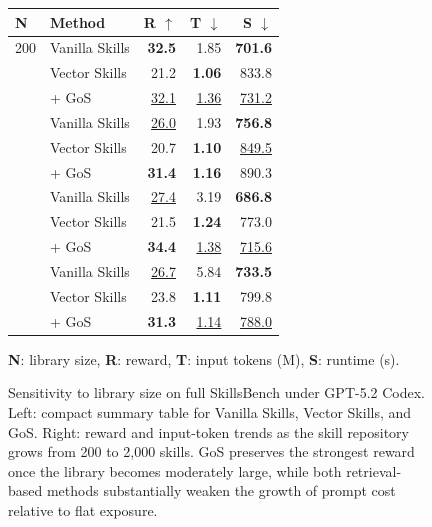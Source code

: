 \begin{figure}[t]
\caption{Sensitivity to library size on full SkillsBench under GPT-5.2 Codex. Left: compact summary table for Vanilla Skills, Vector Skills, and GoS. Right: reward and input-token trends as the skill repository grows from 200 to 2,000 skills. GoS preserves the strongest reward once the library becomes moderately large, while both retrieval-based methods substantially weaken the growth of prompt cost relative to flat exposure.}
\label{fig:scaleup-skillsbench}
\centering
\begin{minipage}[c]{0.46\textwidth}
\centering
\footnotesize
\renewcommand{\arraystretch}{1.0} %
\setlength{\tabcolsep}{5pt}
\begin{tabular}{@{}llrrr@{}}
\toprule
N & Method & R $\uparrow$ & T $\downarrow$ & S $\downarrow$ \\
\midrule
200  & Vanilla Skills    & \textbf{32.5} & 1.85 & \textbf{701.6} \\
     & Vector Skills & 21.2 & \textbf{1.06} & 833.8 \\
     & + GoS         & \underline{32.1} & \underline{1.36} & \underline{731.2} \\
\addlinespace[2pt]
500  & Vanilla Skills    & \underline{26.0} & 1.93 & \textbf{756.8} \\
     & Vector Skills & 20.7 & \textbf{1.10} & \underline{849.5} \\
     & + GoS         & \textbf{31.4} & \textbf{1.16} & 890.3 \\
\addlinespace[2pt]
1000 & Vanilla Skills    & \underline{27.4} & 3.19 & \textbf{686.8} \\
     & Vector Skills & 21.5 & \textbf{1.24} & 773.0 \\
     & + GoS         & \textbf{34.4} & \underline{1.38} & \underline{715.6} \\
\addlinespace[2pt]
2000 & Vanilla Skills    & \underline{26.7} & 5.84 & \textbf{733.5} \\
     & Vector Skills & 23.8 & \textbf{1.11} & 799.8 \\
     & + GoS         & \textbf{31.3} & \underline{1.14} & \underline{788.0} \\
\bottomrule
\end{tabular}

\vspace{8pt}
\parbox{0.95\linewidth}{\scriptsize \textbf{N}: library size, \textbf{R}: reward, \textbf{T}: input tokens (M), \textbf{S}: runtime (s).}
\end{minipage}\hfill
\begin{minipage}[c]{0.52\textwidth}
\centering
\begin{tikzpicture}


\end{tikzpicture}
\end{minipage}
\end{figure}
